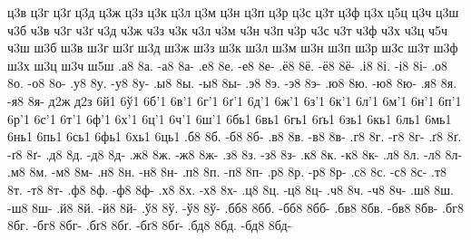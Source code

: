 {ц3в
ц3г
ц3ґ
ц3д
ц3ж
ц3з
ц3к
ц3л
ц3м
ц3н
ц3п
ц3р
ц3с
ц3т
ц3ф
ц3х
ц5ц
ц3ч
ц3ш
ч3б
ч3в
ч3г
ч3ґ
ч3д
ч3ж
ч3з
ч3к
ч3л
ч3м
ч3н
ч3п
ч3р
ч3с
ч3т
ч3ф
ч3х
ч3ц
ч5ч
ч3ш
ш3б
ш3в
ш3г
ш3ґ
ш3д
ш3ж
ш3з
ш3к
ш3л
ш3м
ш3н
ш3п
ш3р
ш3с
ш3т
ш3ф
ш3х
ш3ц
ш3ч
ш5ш
%
%
%
.а8 8а. -а8 8а-
.е8 8е. -е8 8е-
.ё8 8ё. -ё8 8ё-
.і8 8і. -і8 8і-
.о8 8о. -о8 8о-
.у8 8у. -у8 8у-
.ы8 8ы. -ы8 8ы-
.э8 8э. -э8 8э-
.ю8 8ю. -ю8 8ю-
.я8 8я. -я8 8я-
%
%
%
д2ж
д2з
%
%
%
6й1
6ў1
%
%
%
6б'1
6в'1
6г'1
6ґ'1
6д'1
6ж'1
6з'1
6к'1
6л'1
6м'1
6н'1
6п'1
6р'1
6с'1
6т'1
6ф'1
6х'1
6ц'1
6ч'1
6ш'1
6бь1
6вь1
6гь1
6ґь1
6зь1
6кь1
6ль1
6мь1
6нь1
6пь1
6сь1
6фь1
6хь1
6ць1
%
%
.б8 8б. -б8 8б-
.в8 8в. -в8 8в-
.г8 8г. -г8 8г-
.ґ8 8ґ. -ґ8 8ґ-
.д8 8д. -д8 8д-
.ж8 8ж. -ж8 8ж-
.з8 8з. -з8 8з-
.к8 8к. -к8 8к-
.л8 8л. -л8 8л-
.м8 8м. -м8 8м-
.н8 8н. -н8 8н-
.п8 8п. -п8 8п-
.р8 8р. -р8 8р-
.с8 8с. -с8 8с-
.т8 8т. -т8 8т-
.ф8 8ф. -ф8 8ф-
.х8 8х. -х8 8х-
.ц8 8ц. -ц8 8ц-
.ч8 8ч. -ч8 8ч-
.ш8 8ш. -ш8 8ш-
.й8 8й. -й8 8й-
.ў8 8ў. -ў8 8ў-
.бб8 8бб. -бб8 8бб-
.бв8 8бв. -бв8 8бв-
.бг8 8бг. -бг8 8бг-
.бґ8 8бґ. -бґ8 8бґ-
.бд8 8бд. -бд8 8бд-
}
